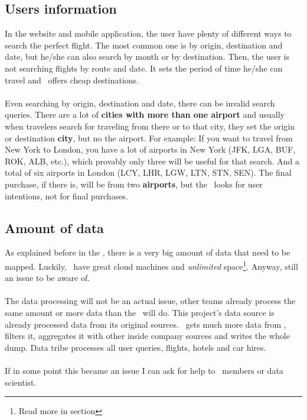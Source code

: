 \subsection{Users information}

In the website and mobile application, the user have plenty of different ways to search the perfect flight. The most common one is by origin, destination and date, but he/she can also search by month or by destination. Then, the user is not searching flights by route and date. It sets the period of time he/she can travel and \company\ offers cheap destinations.
\\\\
Even searching by origin, destination and date, there can be invalid search queries. There are a lot of \textbf{cities with more than one airport} and usually when travelers search for traveling from there or to that city, they set the origin or destination \textbf{city}, but no the airport. For example: If you want to travel from New York to London, you have a lot of airports in New York (JFK, LGA, BUF, ROK, ALB, etc.), which provably only three will be useful for that search. And a total of six airports in London (LCY, LHR, LGW, LTN, STN, SEN). The final purchase, if there is, will be from two \textbf{airports}, but the \thesis\ looks for user intentions, not for final purchases.

\subsection{Amount of data}

As explained before in the , there is a very big amount of data that need to be mapped. Luckily, \company\ have great cloud machines and \textit{unlimited} space\footnote{Read more in section }. Anyway, still an issue to be aware of.
\\\\
The data processing will not be an actual issue, other teams already process the same amount or more data than the \thesis\ will do. This project's data source is already processed data from its original sources. \squad\ gets much more data from , filters it, aggregates it with other inside company sources and writes the whole dump. Data tribe processes all user queries, flights, hotels and car hires.
\\\\
If in some point this became an issue I can ask for help to \squad\ members or data scientist.

